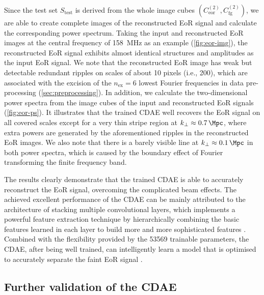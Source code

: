 \documentclass[fleqn,usenatbib]{mnras}
\newcommand{\R}[1]{\mathrm{#1}}
\begin{document}
Since the test set $S_{\R{test}}$ is derived from the whole image cubes
$\left( C_{\R{eor}}^{(2)}, C_{\R{fg}}^{(2)} \right)$, we are able to create
complete images of the reconstructed EoR signal and calculate the
corresponding power spectrum.
Taking the input and reconstructed EoR images at the central frequency of
\SI{158}{\MHz} as an example (\autoref{fig:eor-img}), the reconstructed EoR
signal exhibits almost identical structures and amplitudes as the input EoR
signal.
We note that the reconstructed EoR image has weak but detectable redundant
ripples on scales of about 10 pixels (i.e., \SI{200}{\arcsec}),
which are associated with the excision of the $n_{\R{ex}} = 6$ lowest
Fourier frequencies in data pre-processing (\autoref{sec:preprocessing}).
In addition, we calculate the two-dimensional power spectra from the image
cubes of the input and reconstructed EoR signals (\autoref{fig:eor-ps}).
It illustrates that the trained CDAE well recovers the EoR signal on all
covered scales except for a very thin stripe region at
$k_{\bot} \approx \SI{0.7}{\per\Mpc}$, where extra powers are generated
by the aforementioned ripples in the reconstructed EoR images.
We also note that there is a barely visible line at
$k_{\bot} \approx \SI{0.1}{\per\Mpc}$ in both power spectra, which is
caused by the boundary effect of Fourier transforming the finite frequency
band.

The results clearly demonstrate that the trained CDAE is able to accurately
reconstruct the EoR signal, overcoming the complicated beam effects.
The achieved excellent performance of the CDAE can be mainly attributed
to the architecture of stacking multiple convolutional layers, which
implements a powerful feature extraction technique by hierarchically
combining the basic features learned in each layer to build more and
more sophisticated features \citep{lecun2015}.
Combined with the flexibility provided by the \num{53569} trainable
parameters, the CDAE, after being well trained, can intelligently learn a
model that is optimised to accurately separate the faint EoR signal
\citep[e.g.,][]{domingos2012}.


\subsection{Further validation of the CDAE}
\label{sec:validation}
\end{document}
